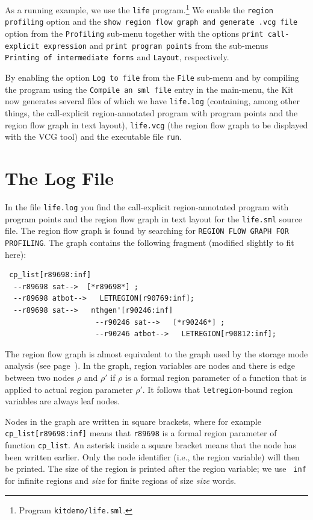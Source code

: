 \documentclass[12pt]{book}
\begin{document}
As a running example, we use the 
%
{\tt life} program.\footnote{Program {\tt kitdemo/life.sml}.}  We
enable the {\tt region profiling} option and the {\tt show region flow
  graph and generate .vcg file} option from the {\tt Profiling}
sub-menu together with the options {\tt print call-explicit
  expression} and {\tt print program points} from the sub-menus {\tt
  Printing of intermediate forms} and {\tt Layout}, respectively.

By enabling the option {\tt Log to file} from the {\tt File} sub-menu
and by compiling the program using the {\tt Compile an sml file} entry in
the main-menu, the Kit now generates several files of which we have
{\tt life.log} (containing, among other things, the call-explicit
region-annotated program with program points and the region flow graph
in text layout), {\tt life.vcg} (the region flow graph to be
displayed with the VCG tool) and the executable file {\tt run}.

\section{The Log File}
In the file {\tt life.log} you find the call-explicit region-annotated
program with program points and the region flow graph in text layout
for the {\tt life.sml} source file.  The region flow graph is found by
searching for \texttt{REGION FLOW GRAPH FOR PROFILING}. The graph
contains the following fragment (modified slightly to fit here):\label{reg_flow_graph.ex}
\begin{verbatim}
 cp_list[r89698:inf]
  --r89698 sat-->  [*r89698*] ;
  --r89698 atbot-->   LETREGION[r90769:inf];
  --r89698 sat-->   nthgen'[r90246:inf]   
                     --r90246 sat-->   [*r90246*] ;
                     --r90246 atbot-->   LETREGION[r90812:inf];
\end{verbatim}
The region flow graph is almost equivalent to the graph used by the
storage mode analysis (see page~\pageref{region flow graph}). In the
graph, region variables are nodes and there is edge between two nodes
$\rho$ and $\rho'$ if $\rho$ is a formal region parameter of a
function that is applied to actual region parameter $\rho'$. It
follows that \texttt{letregion}-bound region variables are always leaf
nodes.

Nodes in the graph are written in square brackets, where for example
\texttt{cp\_list[r89698:inf]} means that \texttt{r89698} is a formal
region parameter of function \texttt{cp\_list}. An asterisk inside a
square bracket means that the node has been written earlier. Only the
node identifier (i.e., the region variable) will then be printed. The
size of the region is printed after the region variable; we use {\tt
  inf} for infinite regions and {\em size\/} for finite regions of size
{\em size\/} words.
\end{document}
